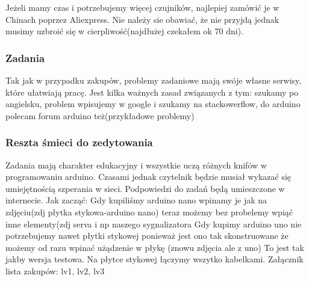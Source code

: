Jeżeli mamy czas i potrzebujemy więcej czujników, najlepiej zamówić je w Chinach poprzez Aliexpress. Nie należy sie obawiać, że nie przyjdą jednak musimy uzbroić się w cierpliwość(najdłużej czekałem ok 70 dni).

\subsubsection{Zadania}
Tak jak w przypadku zakupów, problemy zadaniowe mają swóje własne serwisy, które ułatwiają pracę. Jest kilka ważnych zasad związanych z tym: szukamy po angielsku, problem wpisujemy w google i szukamy na stackowerflow, do arduino polecam forum arduino też(przykładowe problemy)
\subsubsection{Reszta śmieci do zedytowania}
Zadania mają charakter edukacyjny i wszystkie uczą różnych knifów w programowaniu arduino. Czasami jednak czytelnik będzie musiał wykazać się umiejętnością szperania w sieci. Podpowiedzi do zadań będą umieszczone w internecie.
Jak zacząć:
Gdy kupiliśmy arduino nano wpinamy je jak na zdjęciu(zdj płytka stykowa-arduino nano) teraz możemy bez probelemy wpiąć inne elementy(zdj serva i np naszego sygnalizatora
Gdy kupimy arduino uno nie potrzebujemy nawet płytki stykowej ponieważ jest ono tak skonstruowane że możemy od razu wpinać użądzenie w płykę
(znowu zdjęcia ale z uno)
To jest tak jakby wersja testowa. Na płytce stykowej łączymy wszytko kabelkami.
Załącznik lista zakupów: lv1, lv2, lv3

